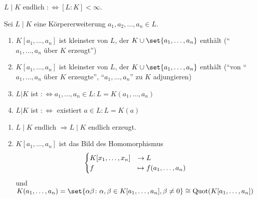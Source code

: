 \begin{definition}
	$L\mid K$ endlich $:\Leftrightarrow [L:K] < \infty$.
\end{definition}


\begin{definition}
	Sei $L\mid K$ eine Körpererweiterung $a_1, a_2, \dots, a_n \in L$.
	\begin{enumerate}[label=(\alph*)]
		\item $K[a_1, \dots, a_n]$ ist kleinster  von $L$, der $K \cup \set{a_1, \dots, a_n}$ enthält (``$a_1, \dots, a_n$ über $K$ erzeugt'')
		\item $K[a_1, \dots, a_n]$ ist kleinster  von $L$, der $K \cup \set{a_1, \dots, a_n}$ enthält (``von ``$a_1, \dots, a_n$ über $K$ erzeugte'', ``$a_1, \dots, a_n$'' zu $K$ adjungieren)
		\item $L | K$ ist  $:\Leftrightarrow a_1, \dots , a_n \in L : L=K(a_1, \dots, a_n)$
		\item $L | K$ ist  $:\Leftrightarrow$ existiert $a \in L: L=K(a)$  
	\end{enumerate}
\end{definition}

\begin{remark}
	\begin{enumerate}[label=(\alph*)]
		\item $L\mid K$ endlich $\Rightarrow L\mid K$ endlich erzeugt.
		\item $K[a_1, \dots, a_n]$ ist das Bild des Homomorphismus
		\begin{align}
		\begin{cases}
		K[x_1, \dots, x_n] &\to L\\
		f &\mapsto f(a_1, \dots, a_n)
		\end{cases}\notag
		\end{align}
		und $K(a_1, \dots , a_n) = \set{\alpha \beta \colon \alpha, \beta \in K[a_1, \dots, a_n], \beta \neq 0} \cong \Quot(K[a_1, \dots, a_n])$
	\end{enumerate}
\end{remark}